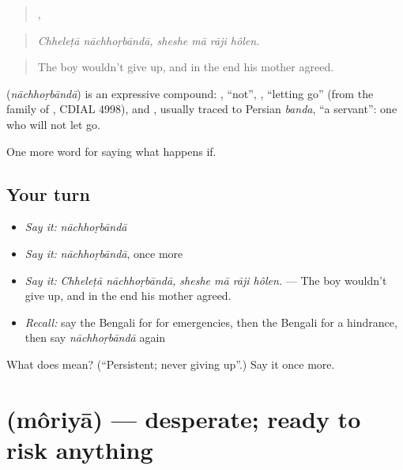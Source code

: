\begin{quote}
 ,    
\end{quote}

\begin{quote}
\emph{Chheleṭā nāchhoṛbāndā, sheshe mā rāji hôlen.}
\end{quote}

\begin{quote}
The boy wouldn't give up, and in the end his mother agreed.
\end{quote}

\begin{cousinweb}
\textbf{} (\emph{nāchhoṛbāndā}) is an expressive compound: , \textquotedblleft{}not\textquotedblright{}, , \textquotedblleft{}letting go\textquotedblright{} (from the family of , CDIAL 4998), and , usually traced to Persian \emph{banda}, \textquotedblleft{}a servant\textquotedblright{}: one who will not let go.
\end{cousinweb}

\begin{grammarlens}[title={What you've built}]
One more word for saying what happens if.
\end{grammarlens}

\subsection*{Your turn}
\begin{itemize}
\raggedright
  \item \emph{Say it:} \emph{nāchhoṛbāndā}
  \item \emph{Say it:} \emph{nāchhoṛbāndā}, once more
  \item \emph{Say it:} \emph{Chheleṭā nāchhoṛbāndā, sheshe mā rāji hôlen.} — The boy wouldn't give up, and in the end his mother agreed.
  \item \emph{Recall:} say the Bengali for for emergencies, then the Bengali for a hindrance, then say \emph{nāchhoṛbāndā} again
\end{itemize}

\begin{tcolorbox}[breakable,colback=teal!4,colframe=teal!35!black,title={Before you move on}]
What does  mean? (\textquotedblleft{}Persistent; never giving up\textquotedblright{}.) Say it once more.
\end{tcolorbox}
\section[\texorpdfstring{\bn{মরিয়া} (môriyā)}{মরিয়া (môriyā)}]{ (môriyā) — desperate; ready to risk anything}

